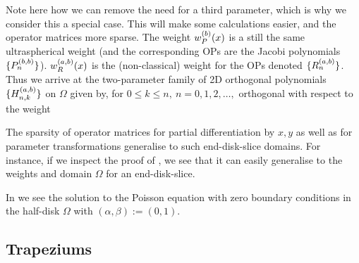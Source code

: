 Note here how we can remove the need for a third parameter, which is why we consider this a special case. This will make some calculations easier, and the operator matrices more sparse. The weight $w_P^{(b)}(x)$ is a still the same ultraspherical weight (and the corresponding OPs are the Jacobi polynomials $\{{P}_n^{(b, b)}\}$). $w_R^{(a,b)}(x)$ is the (non-classical) weight for the OPs denoted $\{R_n^{(a,b)}\}$. Thus we arrive at the two-parameter family of 2D orthogonal polynomials $\{H_{n,k}^{(a,b)}\}$ on $\Omega$ given by, for \(0 \le k \le n, \: n = 0,1,2,\dots,\)
orthogonal with respect to the weight

The sparsity of operator matrices for partial differentiation by $x, y$ as well as for parameter transformations generalise to such end-disk-slice domains. For instance, if we inspect the proof of , we see that it can easily generalise to the weights and domain $\Omega$ for an end-disk-slice.

In  we see the solution to the Poisson equation with zero boundary conditions in the half-disk $\Omega$ with $(\alpha,\beta) := (0,1)$.


\subsection{Trapeziums}\label{section:ds:trapezium}

